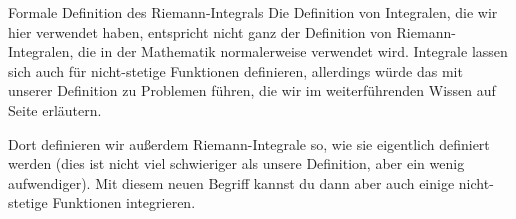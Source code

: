 \documentclass[../../main.tex]{subfiles}
\begin{document}
\begin{advanced}{Formale Definition des Riemann-Integrals}
    Die Definition von Integralen, die wir hier verwendet haben, entspricht nicht ganz der Definition von 
    Riemann-Integralen, die in der Mathematik normalerweise verwendet wird. Integrale lassen sich auch für
    nicht-stetige Funktionen definieren, allerdings würde das mit unserer Definition zu Problemen führen, die wir
    im weiterführenden Wissen auf Seite \pageref{riemannintegral-richtig} erläutern. 
    
    Dort definieren wir außerdem Riemann-Integrale so, wie
    sie eigentlich definiert werden (dies ist nicht viel schwieriger als unsere Definition, aber ein wenig aufwendiger). Mit diesem neuen Begriff kannst du dann aber auch einige nicht-stetige Funktionen integrieren.
\end{advanced}
\end{document}
